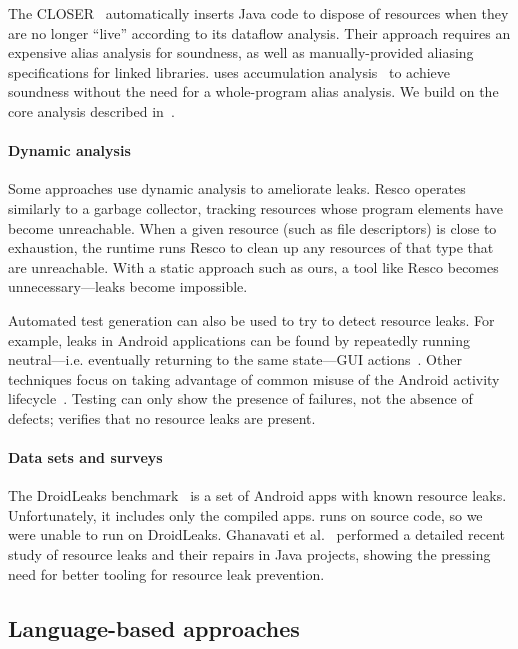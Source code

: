 The CLOSER~\cite{dillig2008closer} automatically inserts Java code to
dispose of resources when they are no longer ``live'' according to its
dataflow analysis.  Their approach requires an expensive alias
analysis for soundness, as well as manually-provided aliasing
specifications for linked libraries. \Tool uses
accumulation analysis~\cite{KelloggRSSE2020,FahndrichLeino03} to
achieve soundness without the need for a whole-program alias analysis.
We build on the core analysis described in~\cite{KelloggRSSE2020}.

\paragraph{Dynamic analysis}
Some approaches use dynamic analysis to ameliorate leaks.  Resco \cite{dai2013resco}
operates similarly to a garbage collector, tracking resources whose program
elements have become unreachable. When a given resource (such as file
descriptors) is close to exhaustion, the runtime runs Resco to clean up any
resources of that type that are unreachable.  With a static approach such as
ours, a tool like Resco becomes unnecessary---leaks become impossible.

Automated test generation can also be used to try to detect resource
leaks. For example, leaks in Android applications can be found by
repeatedly running neutral---i.e. eventually returning to the same
state---GUI actions~\cite{wu2018sentinel,zhang2016automated}.
Other techniques focus on taking advantage of common misuse of
the Android activity lifecycle~\cite{amalfitano2020memories}.
Testing can only show the presence of failures, not the absence of defects;
\tool verifies that no resource leaks are present.

\paragraph{Data sets and surveys}
The DroidLeaks
benchmark~\cite{liu2019droidleaks} is a set of Android apps with known resource
leaks. Unfortunately, it includes only the compiled apps. \Tool runs on
source code, so we were unable to run \tool on DroidLeaks. Ghanavati et
al.~\cite{ghanavati2020memory} performed a detailed recent study of resource
leaks and their repairs in Java projects, showing the pressing need for better
tooling for resource leak prevention.

\subsection{Language-based approaches}\label{sec:rw-language}

